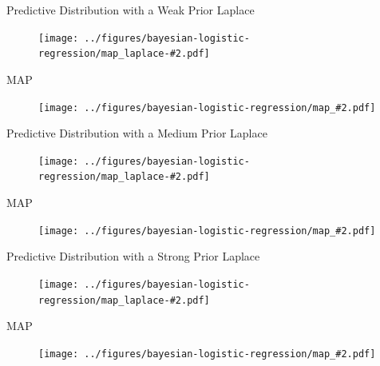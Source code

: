 \documentclass{beamer}
\begin{document}
\newcommand{\LaplaceVsMAP}[2]{
    \begin{frame}{#1}
        Laplace
        \begin{figure}
            \texttt{[image: ../figures/bayesian-logistic-regression/map\_laplace-\#2.pdf]}
        \end{figure}
        MAP
        \begin{figure}
            \texttt{[image: ../figures/bayesian-logistic-regression/map\_\#2.pdf]}
        \end{figure}
    \end{frame}
}

\LaplaceVsMAP{Predictive Distribution with a Weak Prior}{100.0}
\LaplaceVsMAP{Predictive Distribution with a Medium Prior}{1.0}
\LaplaceVsMAP{Predictive Distribution with a Strong Prior}{0.1}
\end{document}

